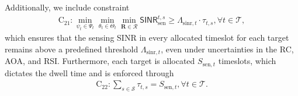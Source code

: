 \documentclass[10pt,journal,compsoc]{IEEEtran}
\theoremstyle{myremark}
\newtheorem{remark}{Remark}
\theoremstyle{myexample}
\begin{document}
Additionally, we include constraint 
\begin{align*}
	\mathrm{C}_{21}: \min_{\psi_t \in \Psi_t} \min_{\theta_t \in \Theta_t} \min_{\mathbf{R} \in \mathcal{R}}  \mathsf{SINR}_\mathrm{sen}^{t,s} \geq \Lambda_{\mathrm{sinr},t} \cdot \tau_{t,s}, \forall t \in \mathcal{T},
\end{align*}
which ensures that the sensing \gls{SINR} in every allocated timeslot for each target remains above a predefined threshold $ \Lambda_{\mathrm{sinr},t} $,  even under uncertainties in the \gls{RC}, \gls{AOA}, and \gls{RSI}. Furthermore, each target is allocated $ S_{\mathrm{sen},t} $ timeslots, which dictates the dwell time and is enforced through
\begin{align*}
	\textstyle
	\mathrm{C}_{22}: \sum_{s \in \mathcal{S}} \tau_{t,s} = S_{\mathrm{sen},t}, \forall t \in \mathcal{T}.
\end{align*}







\end{document}

